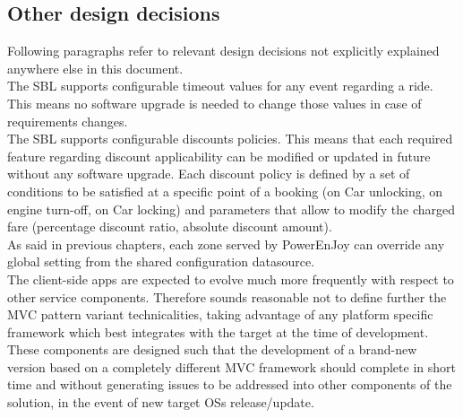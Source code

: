 \subsection{Other design decisions}
Following paragraphs refer to relevant design decisions not explicitly explained anywhere else in this document.\\

The SBL supports configurable timeout values for any event regarding a ride. This means no software upgrade is needed to change those values in case of requirements changes.\\

The SBL supports configurable discounts policies. This means that each required feature regarding discount applicability can be modified or updated in future without any software upgrade. Each discount policy is defined by a set of conditions to be satisfied at a specific point of a booking (on Car unlocking, on engine turn-off, on Car locking) and parameters that allow to modify the charged fare (percentage discount ratio, absolute discount amount).\\

As said in previous chapters, each zone served by PowerEnJoy can override any global setting from the shared configuration datasource.\\
    
The client-side apps are expected to evolve much more frequently with respect to other service components. Therefore sounds reasonable not to define further the MVC pattern variant technicalities, taking advantage of any platform specific framework which best integrates with the target at the time of development. These components are designed such that the development of a brand-new version based on a completely different MVC framework should complete in short time and without generating issues to be addressed into other components of the solution, in the event of new target OSs release/update.